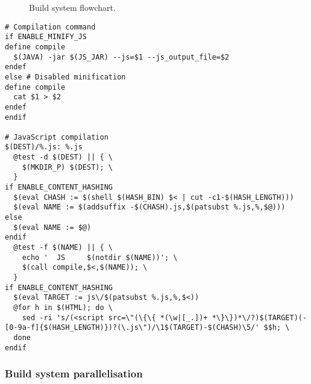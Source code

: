 \begin{figure}[H]
\caption[Build system flowchart]{Build system flowchart.}
\label{fig:build-system-flowchart}
\end{figure}

\newpage

\lstset{language=make}
\begin{lstlisting}[label=lst:build-javascript,caption={
      [Autotools Makefile pattern for JavaScript compilation]
      Autotools Makefile pattern for JavaScript compilation, taken
      from \texttt{www/js/Makefile.am}. The conditional variables
      \texttt{ENABLE\_MINI\_JS} and
      \texttt{ENABLE\_CONTENT\_HASHING} are used to control the
      behaviour of the compilation, and are set by passing argument
      flags to the configuration script.}]
# Compilation command
if ENABLE_MINIFY_JS
define compile
  $(JAVA) -jar $(JS_JAR) --js=$1 --js_output_file=$2
endef
else # Disabled minification
define compile
  cat $1 > $2
endef
endif

# JavaScript compilation
$(DEST)/%.js: %.js
  @test -d $(DEST) || { \
    $(MKDIR_P) $(DEST); \
  }
if ENABLE_CONTENT_HASHING
  $(eval CHASH := $(shell $(HASH_BIN) $< | cut -c1-$(HASH_LENGTH)))
  $(eval NAME := $(addsuffix -$(CHASH).js,$(patsubst %.js,%,$@)))
else
  $(eval NAME := $@)
endif
  @test -f $(NAME) || { \
    echo '  JS     $(notdir $(NAME))'; \
    $(call compile,$<,$(NAME)); \
  }
if ENABLE_CONTENT_HASHING
  $(eval TARGET := js\/$(patsubst %.js,%,$<))
  @for h in $(HTML); do \
    sed -ri 's/(<script src=\"(\{\{ *(\w|[_.])+ *\}\})*\/?)$(TARGET)(-[0-9a-f]{$(HASH_LENGTH)})?(\.js\")/\1$(TARGET)-$(CHASH)\5/' $$h; \
  done
endif
\end{lstlisting}

\subsubsection*{Build system parallelisation}



